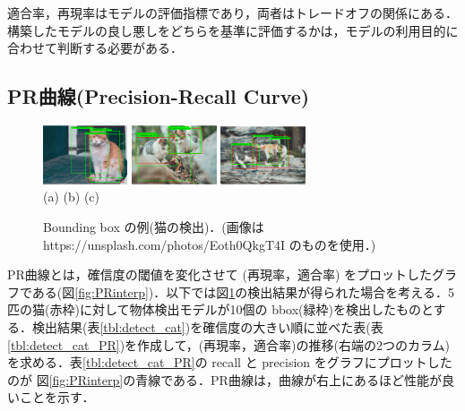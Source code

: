 \documentclass[twocolumn]{jsarticle} %
\begin{document}
適合率，再現率はモデルの評価指標であり，両者はトレードオフの関係にある．構築したモデルの良し悪しをどちらを基準に評価するかは，モデルの利用目的に合わせて判断する必要がある．

\subsection{PR曲線(Precision-Recall Curve)}
\begin{figure}[tb]
    \centering
        \includegraphics[width=2.5cm,clip]{fig/pics_cat-1.eps}
        \includegraphics[width=2.5cm,clip]{fig/pics_cat-2.eps}
        \includegraphics[width=2.5cm,clip]{fig/pics_cat-3.eps}\\
        (a) \hspace{20mm} (b) \hspace{20mm} (c)
    \caption{ Bounding box の例(猫の検出)．(画像は https://unsplash.com/photos/Eoth0QkgT4I のものを使用．)}
    \label{fig:cat}
\end{figure}
PR曲線とは，確信度の閾値を変化させて (再現率，適合率) をプロットしたグラフである(図\ref{fig:PRinterp})．以下では図\ref{fig:cat}の検出結果が得られた場合を考える．5匹の猫(赤枠)に対して物体検出モデルが10個の bbox(緑枠)を検出したものとする．検出結果(表\ref{tbl:detect_cat})を確信度の大きい順に並べた表(表\ref{tbl:detect_cat_PR})を作成して，(再現率，適合率)の推移(右端の2つのカラム)を求める．表\ref{tbl:detect_cat_PR}の recall と precision をグラフにプロットしたのが 図\ref{fig:PRinterp}の青線である．PR曲線は，曲線が右上にあるほど性能が良いことを示す．
\end{document}
